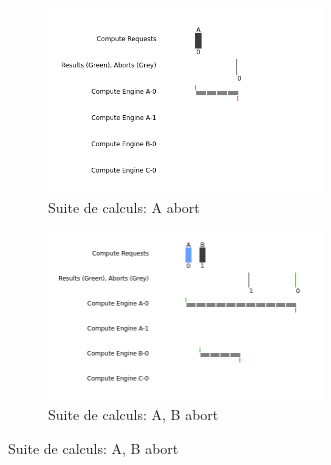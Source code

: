 \documentclass{article}
\begin{document}
\begin{figure}[h]
    \begin{subfigure}{0.45\textwidth}
        \centering
        \includegraphics[width=0.8\textwidth]{figures/A_Abort}
        \caption{Suite de calculs: A abort}
    \end{subfigure}
    \begin{subfigure}{0.45\textwidth}
        \centering
        \includegraphics[width=0.8\textwidth]{figures/A_B_Abort}
        \caption{Suite de calculs: A, B abort}
    \end{subfigure}


\end{figure}
\end{document}
